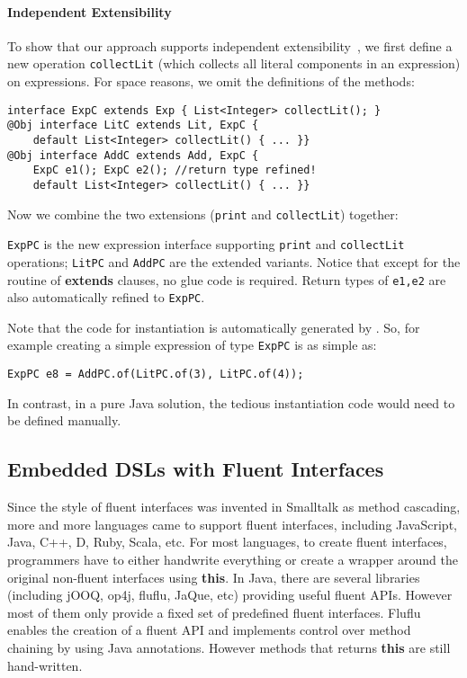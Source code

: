 \paragraph{Independent Extensibility}
To show that our approach supports independent extensibility~\cite{zenger05independentlyextensible}, we first define a
new operation \texttt{collectLit} (which collects all
literal components in an expression) on expressions. For space reasons, 
we omit the definitions of the methods: 

\begin{lstlisting}[]
interface ExpC extends Exp { List<Integer> collectLit(); }
@Obj interface LitC extends Lit, ExpC {
    default List<Integer> collectLit() { ... }}
@Obj interface AddC extends Add, ExpC {
    ExpC e1(); ExpC e2(); //return type refined!
    default List<Integer> collectLit() { ... }}
\end{lstlisting}

\noindent Now we combine the two extensions (\texttt{print} and
\texttt{collectLit}) together:



\noindent \texttt{ExpPC} is the new expression interface supporting
\texttt{print} and \texttt{collectLit} operations; \texttt{LitPC} and
\texttt{AddPC} are the extended variants. Notice that except for the routine of
\textbf{extends} clauses, no glue code is required. Return types of
\texttt{e1,e2} are also automatically refined to \texttt{ExpPC}.

Note that the code for instantiation is automatically generated by \mixin. 
So, for example creating a simple expression of type \texttt{ExpPC} is 
as simple as:
\begin{lstlisting}
ExpPC e8 = AddPC.of(LitPC.of(3), LitPC.of(4));
\end{lstlisting}
\noindent In contrast, in a pure Java solution, the tedious instantiation code would need 
to be defined manually. 

\subsection{Embedded DSLs with Fluent Interfaces}
Since the style of fluent interfaces was invented in Smalltalk as method
cascading, more and more languages came to support fluent interfaces, including
JavaScript, Java, C++, D, Ruby, Scala, etc. For most languages, to create fluent
interfaces, programmers have to either handwrite everything or create a wrapper
around the original non-fluent interfaces using \textbf{this}. In Java, there
are several libraries (including jOOQ, op4j, fluflu, JaQue, etc) providing useful
fluent APIs. However most of them only provide a fixed set of predefined fluent
interfaces. Fluflu enables the creation of a fluent API and implements control
over method chaining by using Java annotations. However methods that returns
\textbf{this} are still hand-written.

